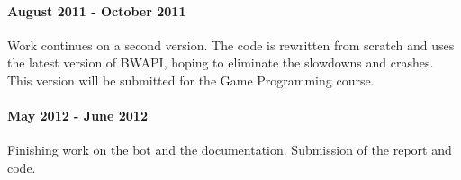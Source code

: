 
\paragraph{August 2011 - October 2011}
Work continues on a second version. The code is rewritten from scratch and uses the latest version of BWAPI, hoping to eliminate the slowdowns and crashes. This version will be submitted for the Game Programming course.  %

\paragraph{May 2012 - June 2012}
Finishing work on the bot and the documentation. Submission of the report and code.


